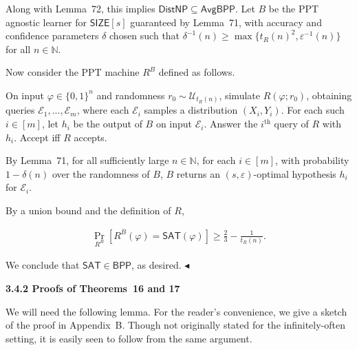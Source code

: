 Along with Lemma 72, this implies ${\mathsf{Dist}}{\mathsf{NP}}\subseteq{\mathsf{Avg}}{\mathsf{BPP}}$. Let $B$ be the PPT agnostic learner for ${\mathsf{SIZE}}[s]$ guaranteed by Lemma 71, with accuracy and confidence parameters $\delta$ chosen such that $\delta^{-1}(n)\geq\max\{t_{R}(n)^{2},\varepsilon^{-1}(n)\}$ for all $n\in\mathbb{N}$.\par




Now consider the PPT machine $R^{B}$ defined as follows.\par



On input $\varphi\in\{0,1\}^{n}$ and randomness $r_{0}\sim\mathcal{U}_{t_{R}(n)}$, simulate $R(\varphi;r_{0})$, obtaining queries $\mathcal{E}_{1},...,\mathcal{E}_{m}$, where each $\mathcal{E}_{i}$ samples a distribution $(X_{i},Y_{i})$. For each such $i\in[m]$, let $h_{i}$ be the output of $B$ on input $\mathcal{E}_{i}$. Answer the $i^{\text{th}}$ query of $R$ with $h_{i}$. Accept iff $R$ accepts.\par



By Lemma 71, for all sufficiently large $n\in\mathbb{N}$, for each $i\in[m]$, with probability $1-\delta(n)$ over the randomness of $B$, $B$ returns an $(s,\varepsilon)$-optimal hypothesis $h_{i}$ for $\mathcal{E}_{i}$.\par




By a union bound and the definition of $R$,\par


\[\begin{gathered}
\Pr_{R^{B}}[R^{B}(\varphi)={\mathsf{SAT}}(\varphi)]\geq\frac{2}{3}-\frac{1}{t_{R}(n)}.
\end{gathered}\]


We conclude that ${\mathsf{SAT}}\in{\mathsf{BPP}}$, as desired.
$\blacktriangleleft$\par






\par\medskip\noindent\textbf{
3.4.2 Proofs of Theorems 16 and 17
}\par




We will need the following lemma. For the reader’s convenience, we give a sketch of the proof in Appendix B. Though not originally stated for the infinitely-often setting, it is easily seen to follow from the same argument.\par



